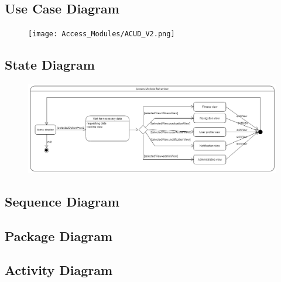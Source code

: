 \subsection{Use Case Diagram}
\begin{figure}[ht]
	\texttt{[image: Access\_Modules/ACUD\_V2.png]}
\end{figure}

\subsection{State Diagram}

\begin{figure}[ht]
	\includegraphics[width=\textwidth]{Access_Modules/AccessStateDiagram.png}
\end{figure}

\subsection{Sequence Diagram}

\subsection{Package Diagram}

\subsection{Activity Diagram}

